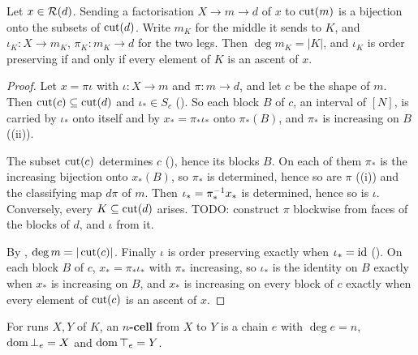 \documentclass[11pt]{article}
\begin{document}
\begin{proposition}\label{prop:factorisations}
  Let $x \in \mathcal{R}(d)$. Sending a factorisation $X \to m \to d$ of $x$ to $\operatorname{cut}(m)$ is a
  bijection onto the subsets of $\operatorname{cut}(d)$. Write $m_K$ for the middle it sends to $K$, and
  $\iota_K : X \to m_K$, $\pi_K : m_K \to d$ for the two legs. Then $\deg m_K = |K|$, and
  $\iota_K$ is order preserving if and only if every element of $K$ is an ascent of $x$.
\end{proposition}
\begin{proof}
  Let $x = \pi\iota$ with $\iota : X \to m$ and $\pi : m \to d$, and let $c$ be the shape of $m$.
  Then $\operatorname{cut}(c) \subseteq \operatorname{cut}(d)$ and $\iota_* \in S_c$ (). So each block $B$ of
  $c$, an interval of $[N]$, is carried by $\iota_*$ onto itself and by $x_* = \pi_*\iota_*$ onto
  $\pi_*(B)$, and $\pi_*$ is increasing on $B$ ((ii)).

  The subset $\operatorname{cut}(c)$ determines $c$ (), hence its blocks $B$. On each of them
  $\pi_*$ is the increasing bijection onto $x_*(B)$, so $\pi_*$ is determined, hence so are $\pi$
  ((i)) and the classifying map $d\pi$ of $m$. Then $\iota_* = \pi_*^{-1} x_*$ is
  determined, hence so is $\iota$. Conversely, every $K \subseteq \operatorname{cut}(d)$ arises. TODO: construct
  $\pi$ blockwise from faces of the blocks of $d$, and $\iota$ from it.

  By , $\deg m = |\operatorname{cut}(c)|$. Finally $\iota$ is order preserving exactly when
  $\iota_* = \operatorname{id}$ (). On each block $B$ of $c$, $x_* = \pi_*\iota_*$ with $\pi_*$
  increasing, so $\iota_*$ is the identity on $B$ exactly when $x_*$ is increasing on $B$, and
  $x_*$ is increasing on every block of $c$ exactly when every element of $\operatorname{cut}(c)$ is an ascent
  of $x$.
\end{proof}

\begin{definition}\label{def:cell}
  For runs $X, Y$ of $K$, an \textbf{$n$-cell} from $X$ to $Y$ is a chain $e$ with
  $\deg e = n$, $\operatorname{dom}\bot_e = X$ and $\operatorname{dom}\top_e = Y$.
\end{definition}

\end{document}

